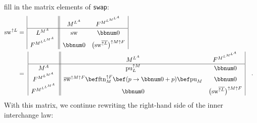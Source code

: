 fill in the matrix elements of \lstinline!swap!:
\begin{align*}
\text{sw}^{\uparrow L} & =\,\begin{array}{|c||cc|}
 & M^{L^{A}} & F^{M^{L^{M^{L^{A}}}}}\\
\hline L^{M^{A}} & \text{sw} & \bbnum 0\\
F^{M^{L^{L^{M^{A}}}}} & \bbnum 0 & \big(\text{sw}^{\overline{\uparrow L}}\big)^{\uparrow M\uparrow F}
\end{array}\\
 & =\,\,\begin{array}{|c||cc|}
 & M^{L^{A}} & F^{M^{L^{M^{L^{A}}}}}\\
\hline M^{A} & \text{pu}_{L}^{\uparrow M} & \bbnum 0\\
F^{M^{L^{M^{A}}}} & \overline{\text{sw}}^{\uparrow M\uparrow F}\bef\text{ftn}_{M}^{\uparrow F}\bef(p\rightarrow\bbnum 0+p)\bef\text{pu}_{M} & \bbnum 0\\
F^{M^{L^{L^{M^{A}}}}} & \bbnum 0 & \big(\text{sw}^{\overline{\uparrow L}}\big)^{\uparrow M\uparrow F}
\end{array}\quad.
\end{align*}
With this matrix, we continue rewriting the right-hand side of the
inner interchange law:
